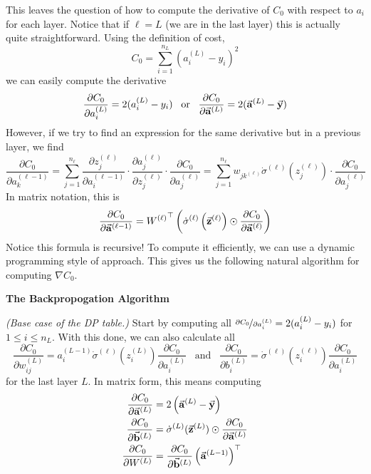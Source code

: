 This leaves the question of how to compute the derivative of $C_0$ with respect to $a_i$ for each layer. Notice that if $\ell = L$ (we 
are in the last layer) this is actually quite straightforward. Using the definition of cost,
\[
    C_0 = \sum_{i = 1}^{n_L} (a_i^{(L)} - y_i)^2
\]
we can easily compute the derivative
\[
    \frac{\partial C_0}{\partial a_i^{(L)}} = 2(a_i^{(L)} - y_i) \;\;\; \text{or} \;\;\; \frac{\partial C_0}{\partial \vec{\mathbf{a}}^{(L)}} = 2(\vec{\mathbf{a}}^{(L)} - \vec{\mathbf{y}})
\]
However, if we try to find an expression for the same derivative but in a previous layer, we find 
\[
    \frac{\partial C_0}{\partial a_k^{(\ell - 1)}} = \sum_{j = 1}^{n_\ell} \frac{\partial z_j^{(\ell)}}{\partial a_i^{(\ell - 1)}} \cdot 
                                                                             \frac{\partial a_j^{(\ell)}}{\partial z_j^{(\ell)}} \cdot 
                                                                             \frac{\partial C_0}{\partial a_j^{(\ell)}}
                                                   = \sum_{j = 1}^{n_\ell}  w_{jk^{(\ell)}} \dot\sigma^{(\ell)}(z_j^{(\ell)}) \cdot \frac{\partial C_0}{\partial a_j^{(\ell)}}
\]
In matrix notation, this is 
\[
    \frac{\partial C_0}{\partial \vec{\mathbf{a}}^{(\ell - 1)}} = {W^{(\ell)}}^\top \left(\dot\sigma^{(\ell)}\left(\vec{\mathbf{z}}^{(\ell)}\right) \odot \frac{\partial C_0}{\partial \vec{\mathbf{a}}^{(\ell)}}\right)
\]
Notice this formula is recursive! To compute it efficiently, we can use a dynamic programming style of approach. This 
gives us the following natural algorithm for computing $\nabla C_0$.

\begin{center}
    \textbf{The Backpropogation Algorithm}
\end{center}

\emph{(Base case of the DP table.)} Start by computing all $\nicefrac{\partial C_0}{\partial a_i^{(L)}} = 2(a_i^{(L)} - y_i)$ for $1 \leq i \leq n_L$.
With this done, we can also calculate all 
\[
    \frac{\partial C_0}{\partial w_{ij}^{(L)}} = a_i^{(L - 1)} \dot\sigma^{(\ell)}(z_i^{(L)}) \frac{\partial C_0}{\partial a_i^{(L)}} \;\;\; \text{and} \;\;\; \frac{\partial C_0}{\partial b_i^{(L)}} = \dot\sigma^{(\ell)}(z_i^{(\ell)}) \frac{\partial C_0}{\partial a_i^{(L)}}
\]
for the last layer $L$. In matrix form, this means computing 
\begin{align*}
    \frac{\partial C_0}{\partial \vec{\mathbf{a}}^{(L)}} &= 2\left(\vec{\mathbf{a}}^{(L)} - \vec{\mathbf{y}}\right) \\
    \frac{\partial C_0}{\partial \vec{\mathbf{b}}^{(L)}} &= \dot\sigma^{(L)}(\vec{\mathbf{z}}^{(L)}) \odot \frac{\partial C_0}{\partial \vec{\mathbf{a}}^{(L)}} \\
    \frac{\partial C_0}{\partial W^{(L)}}        &= \frac{\partial C_0}{\partial \vec{\mathbf{b}}^{(L)}} \left(\vec{\mathbf{a}}^{(L - 1)}\right)^\top
\end{align*}

